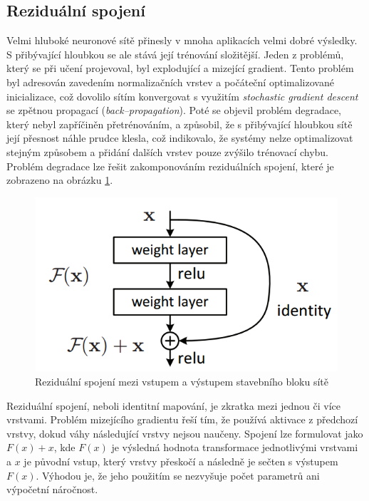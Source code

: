 \subsection{Reziduální spojení}
Velmi hluboké neuronové sítě přinesly v mnoha aplikacích velmi dobré výsledky. S přibývající hloubkou se ale stává její trénování složitější. Jeden z problémů, který se při učení projevoval, byl explodující a mizející gradient\cite{279181}. Tento problém byl adresován zavedením normalizačních vrstev\cite{ioffe2015batch} a počáteční optimalizované inicializace, což dovolilo sítím konvergovat s využitím \textit{stochastic gradient descent} se zpětnou propagací (\textit{back--propagation})\cite{6795724}. Poté se objevil problém degradace, který nebyl zapříčiněn přetrénováním, a způsobil, že s přibývající hloubkou sítě její přesnost náhle prudce klesla, což indikovalo, že systémy nelze optimalizovat stejným způsobem a přidání dalších vrstev pouze zvýšilo trénovací chybu. Problém degradace lze řešit zakomponováním reziduálních spojení, které je zobrazeno na obrázku \ref{fig:residualconnection}\cite{he2015deep}.

\begin{figure}[H]
    \centering
    \includegraphics[scale=0.5]{obrazky-figures/residual_connection.png}
    \caption{\label{fig:residualconnection}Reziduální spojení mezi vstupem a výstupem stavebního bloku sítě\cite{he2015deep}}
\end{figure}

Reziduální spojení, neboli identitní mapování, je zkratka mezi jednou či více vrstvami. Problém mizejícího gradientu řeší tím, že používá aktivace z předchozí vrstvy, dokud váhy následující vrstvy nejsou naučeny. Spojení lze formulovat jako $F(x) + x$, kde $F(x)$ je výsledná hodnota transformace jednotlivými vrstvami a $x$ je původní vstup, který vrstvy přeskočí a následně je sečten s výstupem $F(x)$. Výhodou je, že jeho použitím se nezvyšuje počet parametrů ani výpočetní náročnost\cite{he2015deep}\cite{zaeemzadeh2018normpreservation}.



